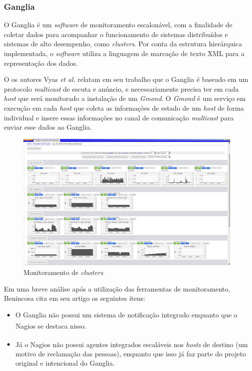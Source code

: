 
\subsubsection{Ganglia}

 O Ganglia é um \textit{software} de monitoramento escalonável, com a finalidade de coletar dados para acompanhar o funcionamento de sistemas distribuídos e sistemas de alto desempenho, como \textit{clusters}. Por conta da estrutura hierárquica implementada, o \textit{software} utiliza a linguagem de marcação de texto XML para a representação dos dados. 
 
 O os autores Vyas \textit{et al.} \cite{vyas2014embedding} relatam em seu trabalho que o Ganglia é baseado em um protocolo \textit{multicast} de escuta e anúncio, e necessariamente precisa ter em cada \textit{host} que será monitorado a instalação de um \textit{Gmond}. O \textit{Gmond} é um serviço em execução em cada \textit{host} que coleta as informações de estado de um \textit{host} de forma individual e insere essas informações no canal de comunicação \textit{multicast} para enviar esse dados ao Ganglia.
 
 \begin{figure}[H]
	\begin{center}
	\includegraphics[scale = 0.50]{img/1024px-ScalableGridEngineGanglia2.png}
		\caption{Monitoramento de \textit{clusters} \cite{Ganglia}}
		\label{fun:fig:ganglia}
	\end{center}
\end{figure}
 
 
 Em uma breve análise após a utilização das ferramentas de monitoramento, Benincosa \cite{benincosa2ganglia} cita em seu artigo os seguintes itens:
\begin{itemize}

\item O Ganglia não possui um sistema de notificação integrado enquanto que o Nagios\textsuperscript{\textregistered} se destaca nisso.
\item Já o Nagios\textsuperscript{\textregistered} não possui agentes integrados escaláveis nos \textit{hosts} de destino (um motivo de reclamação das pessoas), enquanto que isso já faz parte do projeto original e intencional do Ganglia.

\end{itemize}

